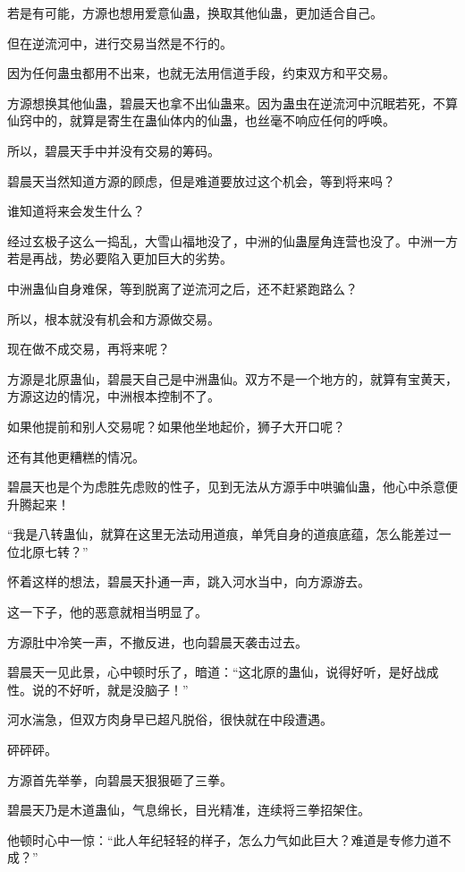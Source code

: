 
\begin{this_body}

若是有可能，方源也想用爱意仙蛊，换取其他仙蛊，更加适合自己。

但在逆流河中，进行交易当然是不行的。

因为任何蛊虫都用不出来，也就无法用信道手段，约束双方和平交易。

方源想换其他仙蛊，碧晨天也拿不出仙蛊来。因为蛊虫在逆流河中沉眠若死，不算仙窍中的，就算是寄生在蛊仙体内的仙蛊，也丝毫不响应任何的呼唤。

所以，碧晨天手中并没有交易的筹码。

碧晨天当然知道方源的顾虑，但是难道要放过这个机会，等到将来吗？

谁知道将来会发生什么？

经过玄极子这么一捣乱，大雪山福地没了，中洲的仙蛊屋角连营也没了。中洲一方若是再战，势必要陷入更加巨大的劣势。

中洲蛊仙自身难保，等到脱离了逆流河之后，还不赶紧跑路么？

所以，根本就没有机会和方源做交易。

现在做不成交易，再将来呢？

方源是北原蛊仙，碧晨天自己是中洲蛊仙。双方不是一个地方的，就算有宝黄天，方源这边的情况，中洲根本控制不了。

如果他提前和别人交易呢？如果他坐地起价，狮子大开口呢？

还有其他更糟糕的情况。

碧晨天也是个为虑胜先虑败的性子，见到无法从方源手中哄骗仙蛊，他心中杀意便升腾起来！

“我是八转蛊仙，就算在这里无法动用道痕，单凭自身的道痕底蕴，怎么能差过一位北原七转？”

怀着这样的想法，碧晨天扑通一声，跳入河水当中，向方源游去。

这一下子，他的恶意就相当明显了。

方源肚中冷笑一声，不撤反进，也向碧晨天袭击过去。

碧晨天一见此景，心中顿时乐了，暗道：“这北原的蛊仙，说得好听，是好战成性。说的不好听，就是没脑子！”

河水湍急，但双方肉身早已超凡脱俗，很快就在中段遭遇。

砰砰砰。

方源首先举拳，向碧晨天狠狠砸了三拳。

碧晨天乃是木道蛊仙，气息绵长，目光精准，连续将三拳招架住。

他顿时心中一惊：“此人年纪轻轻的样子，怎么力气如此巨大？难道是专修力道不成？”


\end{this_body}
